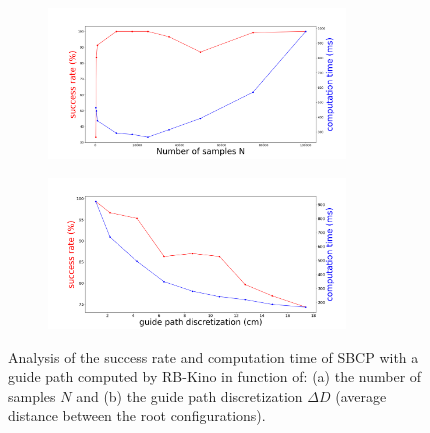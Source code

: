 \begin{figure}[ht]
    \centering
    \captionsetup[subfigure]{justification=centering}
    \centering
    \begin{subfigure}[t]{.48\linewidth}
    \includegraphics[width=\textwidth, height=4cm,trim={0.5cm 0.5cm 0.5cm 0.5cm},clip]{Figures/Chapter_CPSB/success_time_samples.png}
    \caption{}
    \label{fig:cp-sb:impact_param_tuning:a}
    \end{subfigure}
    \begin{subfigure}[t]{.48\linewidth}
    \includegraphics[width=\textwidth, height=4cm,trim={0.5cm 0.5cm 0.5cm 0.5cm},clip]{Figures/Chapter_CPSB/success_time_discretization.png}
    \caption{}
    \label{fig:cp-sb:impact_param_tuning:b}
    \end{subfigure}
    \caption{Analysis of the success rate and computation time of SBCP with a guide path computed by RB-Kino in function of: (a) the number of samples $N$ and (b) the guide path discretization $\Delta D$ (average distance between the root configurations).}
    \label{fig:cp-sb:impact_param_tuning}
\end{figure}

